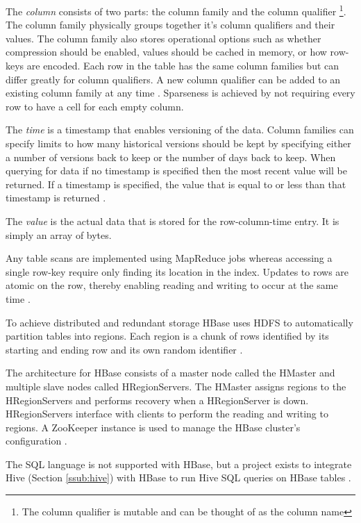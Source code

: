 \documentclass[12pt]{article}
\begin{document}
The \textit{column} consists of two parts: the column family and the column qualifier \footnote{The column qualifier is mutable and can be thought of as the column name}. The column family physically groups together it's column qualifiers and their values. The column family also stores operational options such as whether compression should be enabled, values should be cached in memory, or how row-keys are encoded. Each row in the table has the same column families but can differ greatly for column qualifiers. A new column qualifier can be added to an existing column family at any time \cite{hbasedocs}. Sparseness is achieved by not requiring every row to have a cell for each empty column.

The \textit{time} is a timestamp that enables versioning of the data. Column families can specify limits to how many historical versions should be kept by specifying either a number of versions back to keep or the number of days back to keep. When querying for data if no timestamp is specified then the most recent value will be returned. If a timestamp is specified, the value that is equal to or less than that timestamp is returned \cite{hbasedocs,hbasejimbojw}.

The \textit{value} is the actual data that is stored for the row-column-time entry. It is simply an array of bytes.

Any table scans are implemented using MapReduce jobs whereas accessing a single row-key require only finding its location in the index. Updates to rows are atomic on the row, thereby enabling reading and writing to occur at the same time \cite{hbaseanalysis}.

To achieve distributed and redundant storage HBase uses HDFS to automatically partition tables into regions. Each region is a chunk of rows identified by its starting and ending row and its own random identifier \cite{hbaseanalysis}.

The architecture for HBase consists of a master node called the HMaster and multiple slave nodes called HRegionServers. The HMaster assigns regions to the HRegionServers and performs recovery when a HRegionServer is down. HRegionServers interface with clients to perform the reading and writing to regions. A ZooKeeper \cite{zookeeper} instance is used to manage the HBase cluster's configuration \cite{hbaseanalysis}.

The SQL language is not supported with HBase, but a project exists to integrate Hive (Section \ref{ssub:hive}) with HBase to run Hive SQL queries on HBase tables \cite{hivehbaseintegration}.
\end{document}
